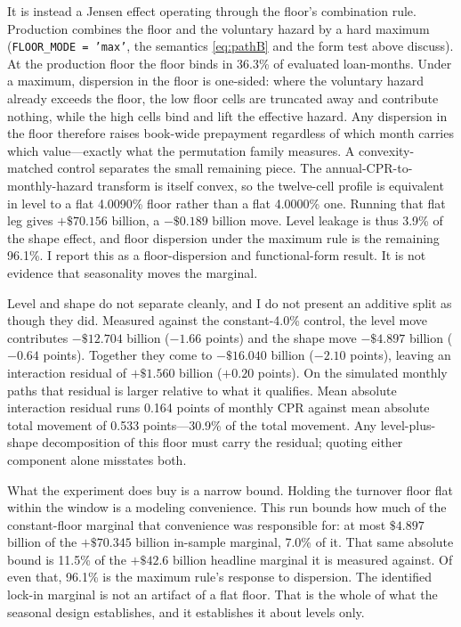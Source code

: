\documentclass[12pt]{article}
\begin{document}
It is instead a Jensen effect operating through the floor's combination rule. Production combines the floor and the voluntary hazard by a hard maximum (\texttt{FLOOR\_MODE = 'max'}, the semantics \eqref{eq:pathB} and the form test above discuss). At the production floor the floor binds in 36.3\% of evaluated loan-months. Under a maximum, dispersion in the floor is one-sided: where the voluntary hazard already exceeds the floor, the low floor cells are truncated away and contribute nothing, while the high cells bind and lift the effective hazard. Any dispersion in the floor therefore raises book-wide prepayment regardless of which month carries which value---exactly what the permutation family measures. A convexity-matched control separates the small remaining piece. The annual-CPR-to-monthly-hazard transform is itself convex, so the twelve-cell profile is equivalent in level to a flat 4.0090\% floor rather than a flat 4.0000\% one. Running that flat leg gives $+\$70.156$ billion, a $-\$0.189$ billion move. Level leakage is thus 3.9\% of the shape effect, and floor dispersion under the maximum rule is the remaining 96.1\%. I report this as a floor-dispersion and functional-form result. It is not evidence that seasonality moves the marginal.

Level and shape do not separate cleanly, and I do not present an additive split as though they did. Measured against the constant-4.0\% control, the level move contributes $-\$12.704$ billion ($-1.66$ points) and the shape move $-\$4.897$ billion ($-0.64$ points). Together they come to $-\$16.040$ billion ($-2.10$ points), leaving an interaction residual of $+\$1.560$ billion ($+0.20$ points). On the simulated monthly paths that residual is larger relative to what it qualifies. Mean absolute interaction residual runs 0.164 points of monthly CPR against mean absolute total movement of 0.533 points---30.9\% of the total movement. Any level-plus-shape decomposition of this floor must carry the residual; quoting either component alone misstates both.

What the experiment does buy is a narrow bound. Holding the turnover floor flat within the window is a modeling convenience. This run bounds how much of the constant-floor marginal that convenience was responsible for: at most $\$4.897$ billion of the $+\$70.345$ billion in-sample marginal, 7.0\% of it. That same absolute bound is 11.5\% of the $+\$42.6$ billion headline marginal it is measured against. Of even that, 96.1\% is the maximum rule's response to dispersion. The identified lock-in marginal is not an artifact of a flat floor. That is the whole of what the seasonal design establishes, and it establishes it about levels only.
\end{document}
